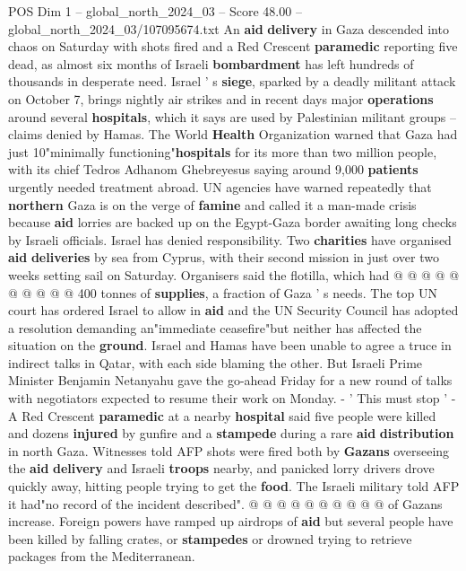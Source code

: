 \begin{textsample}{POS Dim 1 – global\_north\_2024\_03 – Score 48.00 – global\_north\_2024\_03/107095674.txt}  \label{ex:f1_pos_056}
An \textbf{aid} \textbf{delivery} in Gaza descended into chaos on Saturday with shots fired and a Red Crescent \textbf{paramedic} reporting five dead, as almost six months of Israeli \textbf{bombardment} has left hundreds of thousands in desperate need.
Israel ' s \textbf{siege}, sparked by a deadly militant attack on October 7, brings nightly air strikes and in recent days major \textbf{operations} around several \textbf{hospitals}, which it says are used by Palestinian militant groups -- claims denied by Hamas.
The World \textbf{Health} Organization warned that Gaza had just 10"minimally functioning"\textbf{hospitals} for its more than two million people, with its chief Tedros Adhanom Ghebreyesus saying around 9,000 \textbf{patients} urgently needed treatment abroad.
UN agencies have warned repeatedly that \textbf{northern} Gaza is on the verge of \textbf{famine} and called it a man-made crisis because \textbf{aid} lorries are backed up on the Egypt-Gaza border awaiting long checks by Israeli officials.
Israel has denied responsibility.
Two \textbf{charities} have organised \textbf{aid} \textbf{deliveries} by sea from Cyprus, with their second mission in just over two weeks setting sail on Saturday.
Organisers said the flotilla, which had @ @ @ @ @ @ @ @ @ @ 400 tonnes of \textbf{supplies}, a fraction of Gaza ' s needs.
The top UN court has ordered Israel to allow in \textbf{aid} and the UN Security Council has adopted a resolution demanding an"immediate ceasefire"but neither has affected the situation on the \textbf{ground}.
Israel and Hamas have been unable to agree a truce in indirect talks in Qatar, with each side blaming the other.
But Israeli Prime Minister Benjamin Netanyahu gave the go-ahead Friday for a new round of talks with negotiators expected to resume their work on Monday. - ' This must stop ' - A Red Crescent \textbf{paramedic} at a nearby \textbf{hospital} said five people were killed and dozens \textbf{injured} by gunfire and a \textbf{stampede} during a rare \textbf{aid} \textbf{distribution} in north Gaza.
Witnesses told AFP shots were fired both by \textbf{Gazans} overseeing the \textbf{aid} \textbf{delivery} and Israeli \textbf{troops} nearby, and panicked lorry drivers drove quickly away, hitting people trying to get the \textbf{food}.
The Israeli military told AFP it had"no record of the incident described". @ @ @ @ @ @ @ @ @ @ of Gazans increase.
Foreign powers have ramped up airdrops of \textbf{aid} but several people have been killed by falling crates, or \textbf{stampedes} or drowned trying to retrieve packages from the Mediterranean.

\end{textsample}
